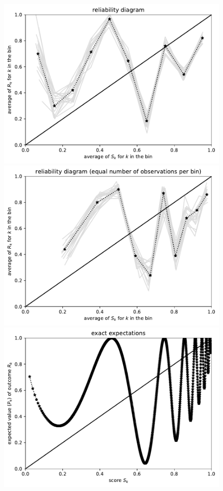 \documentclass{article}
\begin{document}
\begin{figure}
\begin{centering}
\parbox{\imsize}{\includegraphics[width=\imsize]
                {./codes/unweighted/1000_10_2_1/equiprob.pdf}}
\quad\quad
\parbox{\imsize}{\includegraphics[width=\imsize]
                {./codes/unweighted/1000_10_2_1/equisamp.pdf}}

\vspace{\vertsep}

\parbox{\imsize}{\includegraphics[width=\imsize]
                {./codes/unweighted/1000_10_2_1/exact.pdf}}


\end{centering}
\end{figure}
\end{document}
